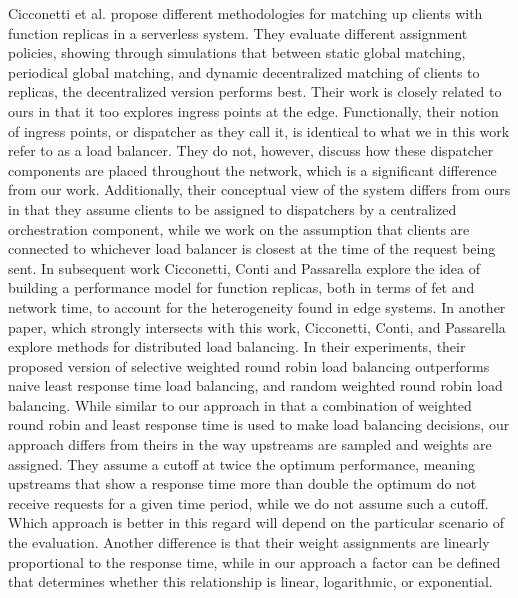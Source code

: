 \documentclass[draft,final]{vutinfth} %
\begin{document}
Cicconetti et al. propose different methodologies for matching up clients with function replicas in a serverless system\cite{cicconettiDistributedComputingEnvironments2020}.
They evaluate different assignment policies, showing through simulations that between static global matching, periodical global matching, and dynamic decentralized matching of clients to replicas, the decentralized version performs best.
Their work is closely related to ours in that it too explores ingress points at the edge.
Functionally, their notion of ingress points, or dispatcher as they call it, is identical to what we in this work refer to as a load balancer.
They do not, however, discuss how these dispatcher components are placed throughout the network, which is a significant difference from our work.
Additionally, their conceptual view of the system differs from ours in that they assume clients to be assigned to dispatchers by a centralized orchestration component, while we work on the assumption that clients are connected to whichever load balancer is closest at the time of the request being sent.
In subsequent work Cicconetti, Conti and Passarella\cite{cicconettiArchitecturePerformanceEvaluation2020} explore the idea of building a performance model for function replicas, both in terms of \gls{fet} and network time, to account for the heterogeneity found in edge systems.
In another paper, which strongly intersects with this work, Cicconetti, Conti, and Passarella explore methods for distributed load balancing\cite{cicconettiDecentralizedFrameworkServerless2020}.
In their experiments, their proposed version of selective weighted round robin load balancing outperforms naive least response time load balancing, and random weighted round robin load balancing.
While similar to our approach in that a combination of weighted round robin and least response time is used to make load balancing decisions, our approach differs from theirs in the way upstreams are sampled and weights are assigned.
They assume a cutoff at twice the optimum performance, meaning upstreams that show a response time more than double the optimum do not receive requests for a given time period, while we do not assume such a cutoff\cite{cicconettiDecentralizedFrameworkServerless2020}.
Which approach is better in this regard will depend on the particular scenario of the evaluation.
Another difference is that their weight assignments are linearly proportional to the response time, while in our approach a factor can be defined that determines whether this relationship is linear, logarithmic, or exponential.
\end{document}

